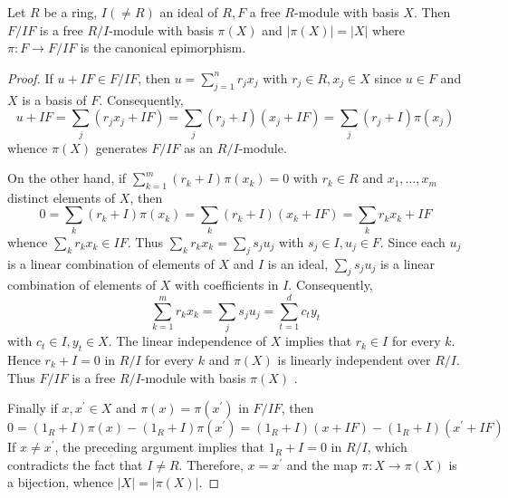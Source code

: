 \begin{lemma}
    Let $R$ be a ring, ${I}(\neq {R})$ an ideal of ${R}, {F}$ a free $R$-module with basis $X$.
    Then ${F} / {IF}$ is a free $R / I$-module with basis $\pi({X})$ and $\left|\pi({X})\right|=\left|X\right|$ where $\pi: {F} \rightarrow {F} / {IF}$ is the canonical epimorphism.
    \begin{proof}
        If $u+I F \in F / I F$, then $u=\sum_{j=1}^n r_j x_j$ with $r_j \in R, x_j \in X$ since $u \in F$ and $X$ is a basis of $F$. Consequently,
        \begin{equation*}
            u+I F
            =\sum_j\left(r_j x_j+I F\right)
            =
            \sum_j\left(r_j+I\right)\left(x_j+I F\right)
            =
            \sum_j\left(r_j+I\right) \pi\left(x_j\right)
        \end{equation*}
        whence $\pi(X)$ generates $F / I F$ as an $R / I$-module.

        On the other hand, if $\sum_{k=1}^m\left(r_k+I\right) \pi\left(x_k\right)=0$ with $r_k \in R$ and $x_1, \ldots, x_m$ distinct elements of $X$, then
        \begin{equation*}
            0
            =
            \sum_k\left(r_k+I\right) \pi\left(x_k\right)
            =
            \sum_k\left(r_k+I\right)\left(x_k+I F\right)
            =
            \sum_k r_k x_k+I F
        \end{equation*}
        whence $\sum_k r_k x_k \in I F$. Thus $\sum_k r_k x_k=\sum_j s_j u_j$ with $s_j \in I, u_j \in F$. Since each $u_j$ is a linear combination of elements of $X$ and $I$ is an ideal, $\sum_j s_j u_j$ is a linear combination of elements of $X$ with coefficients in $I$.
        Consequently,
        \begin{equation*}
            \sum_{k=1}^m r_k x_k
            =
            \sum_j s_j u_j
            =
            \sum_{t=1}^d c_t y_t
        \end{equation*}
        with $c_t \in I, y_t \in X$. The linear independence of $X$ implies that $r_k \in I$ for every $k$.
        Hence $r_k+I=0$ in $R / I$ for every $k$ and $\pi(X)$ is linearly independent over $R / I$. Thus $F / I F$ is a free $R / I$-module with basis $\pi(X)$ .

        Finally if $x, x^{\prime} \in X$ and $\pi(x)=\pi\left(x^{\prime}\right)$ in $F / I F$, then
        \begin{equation*}
            0
            =
            \left(1_R+I\right) \pi(x)-\left(1_R+I\right) \pi\left(x^{\prime}\right)
            =
            \left(1_R+I\right)\left(x+IF\right)-\left(1_R+I\right)\left(x^\prime+IF\right)
        \end{equation*}
        If $x \neq x^{\prime}$, the preceding argument implies that $1_R + I=0$ in $R/I$, which contradicts the fact that $I \neq R$.
        Therefore, $x=x^{\prime}$ and the map $\pi: X \rightarrow \pi(X)$ is a bijection, whence $|X|=|\pi(X)|$.
    \end{proof}
\end{lemma}


